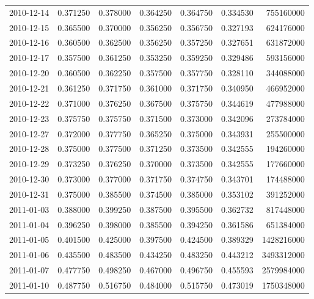 \begin{tabular}{lrrrrrr}
2010-12-14 &    0.371250 &    0.378000 &    0.364250 &    0.364750 &    0.334530 &   755160000 \\
2010-12-15 &    0.365500 &    0.370000 &    0.356250 &    0.356750 &    0.327193 &   624176000 \\
2010-12-16 &    0.360500 &    0.362500 &    0.356250 &    0.357250 &    0.327651 &   631872000 \\
2010-12-17 &    0.357500 &    0.361250 &    0.353250 &    0.359250 &    0.329486 &   593156000 \\
2010-12-20 &    0.360500 &    0.362250 &    0.357500 &    0.357750 &    0.328110 &   344088000 \\
2010-12-21 &    0.361250 &    0.371750 &    0.361000 &    0.371750 &    0.340950 &   466952000 \\
2010-12-22 &    0.371000 &    0.376250 &    0.367500 &    0.375750 &    0.344619 &   477988000 \\
2010-12-23 &    0.375750 &    0.375750 &    0.371500 &    0.373000 &    0.342096 &   273784000 \\
2010-12-27 &    0.372000 &    0.377750 &    0.365250 &    0.375000 &    0.343931 &   255500000 \\
2010-12-28 &    0.375000 &    0.377500 &    0.371250 &    0.373500 &    0.342555 &   194260000 \\
2010-12-29 &    0.373250 &    0.376250 &    0.370000 &    0.373500 &    0.342555 &   177660000 \\
2010-12-30 &    0.373000 &    0.377000 &    0.371750 &    0.374750 &    0.343701 &   174488000 \\
2010-12-31 &    0.375000 &    0.385500 &    0.374500 &    0.385000 &    0.353102 &   391252000 \\
2011-01-03 &    0.388000 &    0.399250 &    0.387500 &    0.395500 &    0.362732 &   817448000 \\
2011-01-04 &    0.396250 &    0.398000 &    0.385500 &    0.394250 &    0.361586 &   651384000 \\
2011-01-05 &    0.401500 &    0.425000 &    0.397500 &    0.424500 &    0.389329 &  1428216000 \\
2011-01-06 &    0.435500 &    0.483500 &    0.434250 &    0.483250 &    0.443212 &  3493312000 \\
2011-01-07 &    0.477750 &    0.498250 &    0.467000 &    0.496750 &    0.455593 &  2579984000 \\
2011-01-10 &    0.487750 &    0.516750 &    0.484000 &    0.515750 &    0.473019 &  1750348000 \\

\end{tabular}
